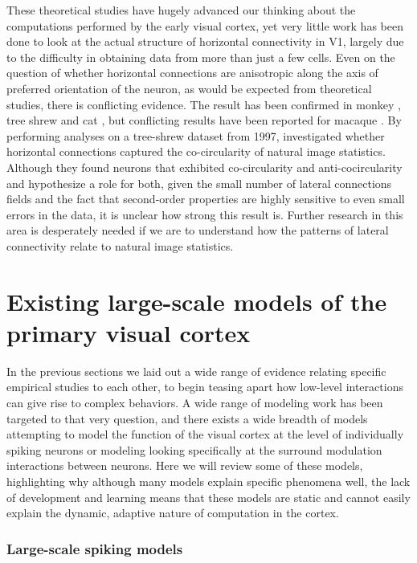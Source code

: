 These theoretical studies have hugely advanced our thinking about the
computations performed by the early visual cortex, yet very little
work has been done to look at the actual structure of horizontal
connectivity in V1, largely due to the difficulty in obtaining data
from more than just a few cells. Even on the question of whether
horizontal connections are anisotropic along the axis of preferred
orientation of the neuron, as would be expected from theoretical
studies, there is conflicting evidence. The result has been confirmed
in monkey \citep{Sincich2001}, tree shrew \citep{Bosking1997} and cat
\citep{Schmidt1997}, but conflicting results have been reported for
macaque \citep{Angelucci2002}. By performing analyses on a tree-shrew
dataset from 1997, \cite{Hunt2011} investigated whether horizontal 
connections captured the co-circularity of natural image
statistics. Although they found neurons that exhibited co-circularity
and anti-cocircularity and hypothesize a role for both, given the
small number of lateral connections fields and the fact that
second-order properties are highly sensitive to even small errors in
the data, it is unclear how strong this result is. Further research in
this area is desperately needed if we are to understand how the
patterns of lateral connectivity relate to natural image statistics.

\section{Existing large-scale models of the primary visual cortex}

In the previous sections we laid out a wide range of evidence
relating specific empirical studies to each other, to begin teasing
apart how low-level interactions can give rise to complex behaviors. A
wide range of modeling work has been targeted to that very
question, and there exists a wide breadth of models attempting to model
the function of the visual cortex at the level of individually spiking
neurons or modeling looking specifically at the surround modulation
interactions between neurons. Here we will review some of these
models, highlighting why although many models explain specific
phenomena well, the lack of development and learning means that these
models are static and cannot easily explain the dynamic, adaptive
nature of computation in the cortex.

\subsubsection{Large-scale spiking models} \label{LargeModels}

